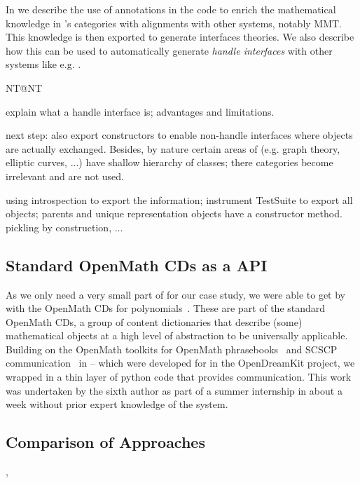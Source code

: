 In \cite{DehKohKon:iop16} we describe the use of annotations in the code to enrich the
mathematical knowledge in \Sage's categories with alignments with other systems, notably
MMT. This knowledge is then exported to generate interfaces theories. We also describe how
this can be used to automatically generate \emph{handle interfaces} with other systems
like e.g. \GAP.
\begin{todolist}{NT@NT}
\item explain what a handle interface is; advantages and limitations.
\item next step: also export constructors to enable non-handle interfaces where objects
  are actually exchanged. Besides, by nature certain areas of \Sage (e.g. graph theory,
  elliptic curves, ...) have shallow hierarchy of classes; there categories become
  irrelevant and are not used. 
\item using introspection to export the information; instrument TestSuite to export all
  objects; parents and unique representation objects have a constructor method. pickling
  by construction, ...
\end{todolist}

\subsection{Standard OpenMath CDs as a \Singular API}

As we only need a very small part of \Singular for our case study, we were able to get by
with the OpenMath CDs for polynomials~\cite{OMCD:poly:on}. These are part of the standard
OpenMath CDs, a group of content dictionaries that describe (some) mathematical objects at
a high level of abstraction to be universally applicable. Building on the OpenMath
toolkits for OpenMath phrasebooks~\cite{py-openmath:on} and SCSCP
communication~\cite{py-scscp:on} in \Python -- which were developed for \Sage in the
OpenDreamKit project, we wrapped \Singular in a thin layer of python code that provides
\SCSCP communication. This work was undertaken by the sixth author as part of a summer
internship in about a week without prior expert knowledge of the system.

\subsection{Comparison of Approaches}

, 
